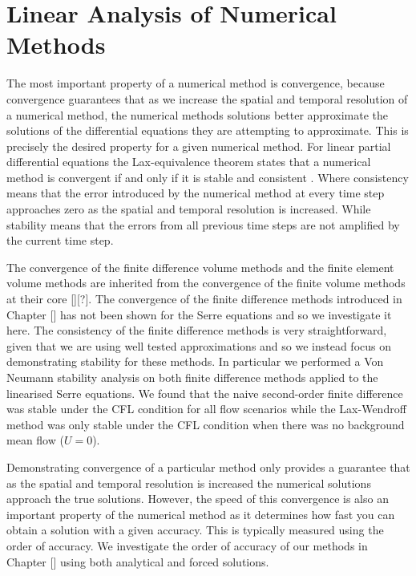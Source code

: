 
\chapter{Linear Analysis of Numerical Methods}
\label{chp:AnalNumMethod}
The most important property of a numerical method is convergence, because convergence guarantees that as we increase the spatial and temporal resolution of a numerical method, the numerical methods solutions better approximate the solutions of the differential equations they are attempting to approximate. This is precisely the desired property for a given numerical method. For linear partial differential equations the Lax-equivalence theorem states that a numerical method is convergent if and only if it is stable and consistent \cite{Lax-Richtmyer-1956-267}. Where consistency means that the error introduced by the numerical method at every time step approaches zero as the spatial and temporal resolution is increased. While stability means that the errors from all previous time steps are not amplified by the current time step.

The convergence of the finite difference volume methods and the finite element volume methods are inherited from the convergence of the finite volume methods at their core [][?]. The convergence of the finite difference methods introduced in Chapter [] has not been shown for the Serre equations and so we investigate it here. The consistency of the finite difference methods is very straightforward, given that we are using well tested approximations and so we instead focus on demonstrating stability for these methods. In particular we performed a Von Neumann stability \cite{Charney-etal-1950-237} analysis on both finite difference methods applied to the linearised Serre equations. We found that the naive second-order finite difference was stable under the CFL condition for all flow scenarios while the Lax-Wendroff method was only stable under the CFL condition when there was no background mean flow ($U=0$).

Demonstrating convergence of a particular method only provides a guarantee that as the spatial and temporal resolution is increased the numerical solutions approach the true solutions. However, the speed of this convergence is also an important property of the numerical method as it determines how fast you can obtain a solution with a given accuracy. This is typically measured using the order of accuracy. We investigate the order of accuracy of our methods in Chapter [] using both analytical and forced solutions. 

